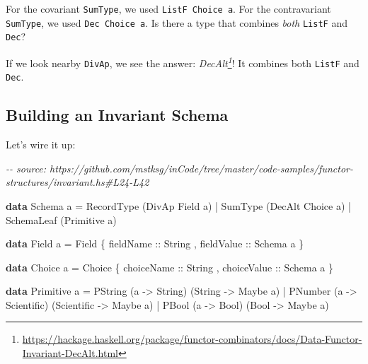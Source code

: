 \documentclass[]{article}
\newenvironment{Shaded}{}{}
\newcommand{\CommentTok}[1]{\textcolor[rgb]{0.38,0.63,0.69}{\textit{#1}}}
\newcommand{\DataTypeTok}[1]{\textcolor[rgb]{0.56,0.13,0.00}{#1}}
\newcommand{\KeywordTok}[1]{\textcolor[rgb]{0.00,0.44,0.13}{\textbf{#1}}}
\newcommand{\NormalTok}[1]{#1}
\newcommand{\OperatorTok}[1]{\textcolor[rgb]{0.40,0.40,0.40}{#1}}
\newcommand{\OtherTok}[1]{\textcolor[rgb]{0.00,0.44,0.13}{#1}}
\renewcommand{\href}[2]{#2\footnote{\url{#1}}}
\begin{document}
For the covariant \texttt{SumType}, we used \texttt{ListF\ Choice\ a}. For the
contravariant \texttt{SumType}, we used \texttt{Dec\ Choice\ a}. Is there a type
that combines \emph{both} \texttt{ListF} and \texttt{Dec}?

If we look nearby \texttt{DivAp}, we see the answer:
\emph{\href{https://hackage.haskell.org/package/functor-combinators/docs/Data-Functor-Invariant-DecAlt.html}{DecAlt}}!
It combines both \texttt{ListF} and \texttt{Dec}.

\subsection{Building an Invariant Schema}\label{building-an-invariant-schema}

Let's wire it up:

\begin{Shaded}
\begin{Highlighting}[]
\CommentTok{{-}{-} source: https://github.com/mstksg/inCode/tree/master/code{-}samples/functor{-}structures/invariant.hs\#L24{-}L42}

\KeywordTok{data} \DataTypeTok{Schema}\NormalTok{ a }\OtherTok{=}
      \DataTypeTok{RecordType}\NormalTok{  (}\DataTypeTok{DivAp}  \DataTypeTok{Field}\NormalTok{  a)}
    \OperatorTok{|} \DataTypeTok{SumType}\NormalTok{     (}\DataTypeTok{DecAlt} \DataTypeTok{Choice}\NormalTok{ a)}
    \OperatorTok{|} \DataTypeTok{SchemaLeaf}\NormalTok{  (}\DataTypeTok{Primitive}\NormalTok{ a)}

\KeywordTok{data} \DataTypeTok{Field}\NormalTok{ a }\OtherTok{=} \DataTypeTok{Field}
\NormalTok{    \{}\OtherTok{ fieldName  ::} \DataTypeTok{String}
\NormalTok{    ,}\OtherTok{ fieldValue ::} \DataTypeTok{Schema}\NormalTok{ a}
\NormalTok{    \}}

\KeywordTok{data} \DataTypeTok{Choice}\NormalTok{ a }\OtherTok{=} \DataTypeTok{Choice}
\NormalTok{    \{}\OtherTok{ choiceName  ::} \DataTypeTok{String}
\NormalTok{    ,}\OtherTok{ choiceValue ::} \DataTypeTok{Schema}\NormalTok{ a}
\NormalTok{    \}}

\KeywordTok{data} \DataTypeTok{Primitive}\NormalTok{ a }\OtherTok{=}
      \DataTypeTok{PString}\NormalTok{ (a }\OtherTok{{-}\textgreater{}} \DataTypeTok{String}\NormalTok{)     (}\DataTypeTok{String}     \OtherTok{{-}\textgreater{}} \DataTypeTok{Maybe}\NormalTok{ a)}
    \OperatorTok{|} \DataTypeTok{PNumber}\NormalTok{ (a }\OtherTok{{-}\textgreater{}} \DataTypeTok{Scientific}\NormalTok{) (}\DataTypeTok{Scientific} \OtherTok{{-}\textgreater{}} \DataTypeTok{Maybe}\NormalTok{ a)}
    \OperatorTok{|} \DataTypeTok{PBool}\NormalTok{   (a }\OtherTok{{-}\textgreater{}} \DataTypeTok{Bool}\NormalTok{)       (}\DataTypeTok{Bool}       \OtherTok{{-}\textgreater{}} \DataTypeTok{Maybe}\NormalTok{ a)}
\end{Highlighting}
\end{Shaded}
\end{document}

